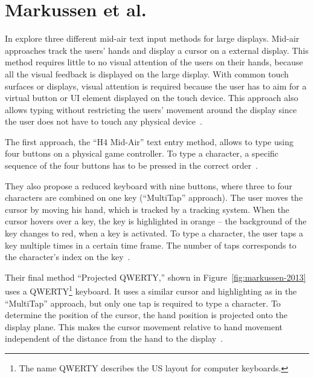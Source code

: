 \section{Markussen et al.}\label{section:markussen-2013}
In {} \citeauthor{Markussen.2013} explore three different mid-air text input methods for large displays. Mid-air approaches track the users' hands and display a cursor on a external display. This method requires little to no visual attention of the users on their hands, because all the visual feedback is displayed on the large display. With common touch surfaces or displays, visual attention is required because the user has to aim for a virtual button or \gls{UI} element displayed on the touch device.
This approach also allows typing without restricting the users' movement around the display since the user does not have to touch any physical device~\cite[401]{Markussen.2013}.

The first approach, the \enquote{H4 Mid-Air} text entry method, allows to type using four buttons on a physical game controller. To type a character, a specific sequence of the four buttons has to be pressed in the correct order~\cite[406]{Markussen.2013}.

They also propose a reduced keyboard with nine buttons, where three to four characters are combined on one key (\enquote{MultiTap} approach). The user moves the cursor by moving his hand, which is tracked by a tracking system. When the cursor hovers over a key, the key is highlighted in orange -- the background of the key changes to red, when a key is activated. To type a character, the user taps a key multiple times in a certain time frame. The number of taps corresponds to the character's index on the key~\cite[407]{Markussen.2013}. %

Their final method \enquote{Projected QWERTY,} shown in Figure~\ref{fig:markussen-2013} uses a QWERTY\footnote{The name QWERTY describes the US layout for computer keyboards.} keyboard. It uses a similar cursor and highlighting as in the \enquote{MultiTap} approach, but only one tap is required to type a character. To determine the position of the cursor, the hand position is projected onto the display plane. This makes the cursor movement relative to hand movement independent of the distance from the hand to the display~\cite[408]{Markussen.2013}. 

